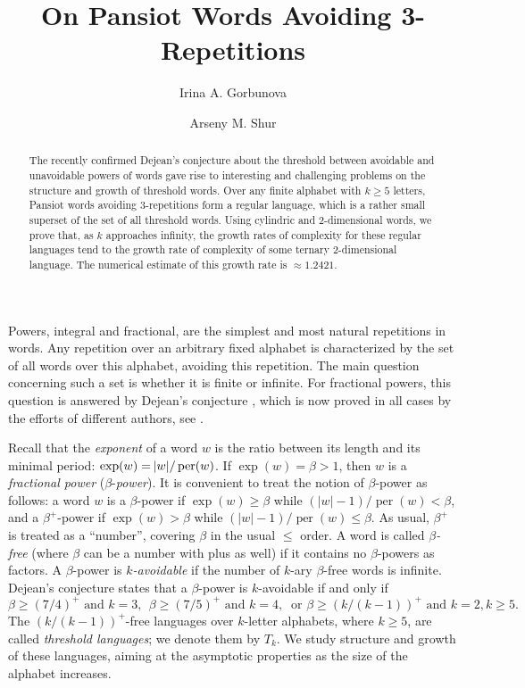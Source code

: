\documentclass[submission,copyright]{eptcs}\providecommand{\event}{WORDS 2011}
\title{On Pansiot Words Avoiding 3-Repetitions}
\author{Irina A. Gorbunova
\institute{Ural Federal University\\
Ekaterinburg, Russia}
\email{i.a.gorbunova@gmail.com}
\and Arseny M. Shur
\institute{Ural Federal University\\
Ekaterinburg, Russia}
\email{arseny.shur@usu.ru}
}
\DeclareMathOperator{\per}{per}
\begin{document}
\maketitle
{}

\begin{abstract}
The recently confirmed Dejean's conjecture about the threshold between avoidable and un\-avoidable powers of words gave rise to interesting and challenging problems on the structure and growth of threshold words. Over any finite alphabet with $k\ge 5$ letters, Pansiot words avoiding 3-repetitions form a regular language, which is a rather small superset of the set of all threshold words. Using cylindric and 2-dimensional words, we prove that, as $k$ approaches infinity, the growth rates of complexity for these regular languages tend to the growth rate of complexity of some ternary 2-dimensional language. The numerical estimate of this growth rate is ${\approx}1.2421$.
\end{abstract}

Powers, integral and fractional, are the simplest and most natural repetitions in words. Any repetition over an arbitrary fixed alphabet is characterized by the set of all words over this alphabet, avoiding this repetition. The main question concerning such a set is whether it is finite or infinite. For fractional powers, this question is answered by Dejean's conjecture \cite{Dej}, which is now proved in all cases by the efforts of different authors, see \cite{Pan,Mou,MNC,Car,CR1,CR2,Rao}.

Recall that the \textit{exponent} of a word $w$ is the ratio between its length and its minimal period: $\exp(w)=~\hspace{-1.5mm}|w|/\per(w)$. If $\exp(w)=\beta>1$, then $w$ is a \textit{fractional power} ($\beta$-\textit{power}). It is convenient to treat the notion of $\beta$-power as follows: a word $w$ is a $\beta$-power if $\exp(w)\ge\beta$ while $(|w|{-}1)/\per(w)<\beta$, and a $\beta^+\!$-power if $\exp(w)>\beta$ while $(|w|{-}1)/\per(w)\le\beta$. As usual, $\beta^+$ is treated as a ``number'', covering $\beta$ in the usual $\le$ order. A word is called \textit{$\beta$-free} (where $\beta$ can be a number with plus as well) if it contains no $\beta$-powers as factors. A $\beta$-power is \textit{$k$-avoidable} if the number of $k$-ary $\beta$-free words is infinite. Dejean's conjecture states that a $\beta$-power is $k$-avoidable if and only if
$$
\beta\ge(7/4)^+\text{ and } k=3,\ \ \beta\ge(7/5)^+\text{ and } k=4,\ \text{ or }\beta\ge(k/(k{-}1))^+\text{ and } k=2,k\ge5.
$$
The $(k/(k{-}1))^+\!$-free languages over $k$-letter alphabets, where $k\ge5$, are called \textit{threshold languages}; we denote them by $T_k$. We study structure and growth of these languages, aiming at the asymptotic properties as the size of the alphabet increases.
\end{document}
